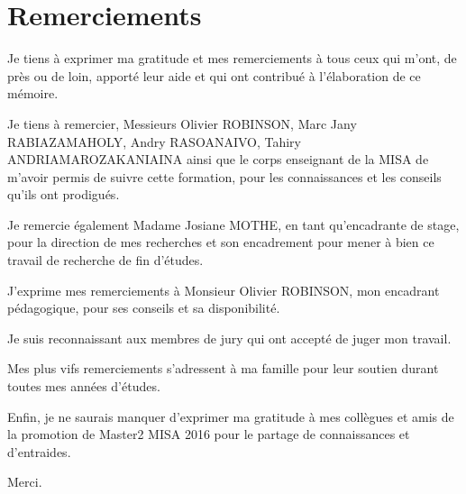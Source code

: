 \chapter*{Remerciements}
\qquad Je tiens à exprimer ma gratitude et mes remerciements à tous ceux qui m'ont, de près ou de loin, apporté leur aide et qui ont contribué à l'élaboration de ce mémoire.

\bigskip

\qquad Je tiens  à remercier, Messieurs Olivier ROBINSON, Marc Jany RABIAZAMAHOLY, Andry RASOANAIVO, Tahiry ANDRIAMAROZAKANIAINA ainsi que le corps enseignant de la MISA de m’avoir permis de suivre cette formation, pour les connaissances et les conseils qu’ils ont prodigués.

\bigskip

\qquad Je remercie également Madame Josiane MOTHE, en tant qu'encadrante de stage, pour la direction de mes recherches et son encadrement pour mener à bien ce travail de recherche de fin d'études.

\bigskip

\qquad J'exprime  mes remerciements à Monsieur Olivier ROBINSON, mon encadrant pédagogique, pour ses conseils et sa disponibilité.

\bigskip

\qquad Je suis reconnaissant aux membres de jury qui ont accepté de juger mon travail.

\bigskip

\qquad Mes plus vifs remerciements s’adressent à ma famille  pour leur soutien durant toutes mes années d’études.

\bigskip

\qquad Enfin, je ne saurais manquer d’exprimer ma gratitude à mes collègues et amis de la promotion de Master2 MISA 2016 pour le partage de connaissances et d'entraides.

\bigskip


\noindent Merci.